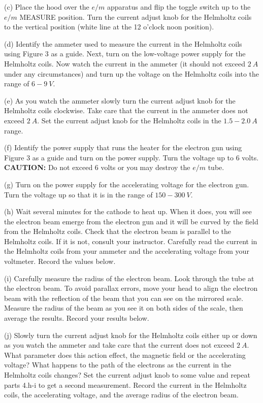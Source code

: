 (c) Place the hood over the $e/m$ apparatus and flip the 
toggle switch up to the $e/m$ MEASURE
position.
Turn the current adjust knob for the Helmholtz coils to the vertical position (white line
at the 12 o'clock noon position).

(d) Identify the ammeter used to measure the current in the Helmholtz
coils using Figure 3 as a guide. 
Next, turn on the low-voltage power supply for the Helmholtz coils.
Now watch the current in the ammeter (it should not exceed $2~A$ under
any circumstances) and
turn up the voltage on the Helmholtz coils into the range of $6-9~V$.

(e) As you watch the ammeter slowly turn the current adjust knob for the Helmholtz
coils clockwise. Take care that
the current in the ammeter does not exceed $2 ~A$.
Set the current adjust knob for the Helmholtz coils in the $1.5-2.0~A$ range.

(f) Identify the power supply that runs the heater for the electron gun using Figure 3 as a guide
and turn on the power supply. Turn the voltage up to 6 volts.
{\bf CAUTION:} Do not exceed 6 volts or you may destroy the $e/m$
tube.

(g) Turn on the power supply for the accelerating voltage for the electron gun.
Turn the voltage up so that it is in the range of $150-300~V$.

(h) Wait several minutes for the cathode to heat up. When
it does, you will see the electron beam emerge from
the electron gun and it will be curved by the field from
the Helmholtz coils. Check that the electron beam is
parallel to the Helmholtz coils. If it is not, consult your instructor.
 Carefully read the current in the Helmholtz coils from
your ammeter and the accelerating voltage from your
voltmeter. Record the values below.
\vspace{25mm}

(i) Carefully measure the radius of the electron beam.
Look through the tube at the electron beam. To avoid
parallax errors, move your head to align the electron
beam with the reflection of the beam that you can see
on the mirrored scale. Measure the radius of the beam as you
see it on both sides of the scale, then average the results.
Record your results below.
\vspace{25mm}

(j) Slowly turn the current adjust knob for the Helmholtz
coils either up or down as you watch the ammeter and take care that
the current does not exceed $2 ~A$.
What parameter does this action effect, the magnetic field or the
accelerating voltage?
What happens to the path of the electrons as the current in the Helmholtz
coils changes?
Set the current adjust knob to some value and
repeat parts 4.h-i to get a second measurement. Record the current in the
Helmholtz coils, the accelerating voltage, and the average radius of the electron beam.
\vspace{30mm}

